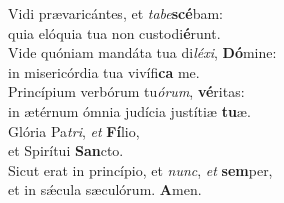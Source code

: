 \evenverse Vidi prævaricántes, et \textit{ta}\textit{be}\textbf{scé}bam:~\*\\
\evenverse quia elóquia tua non custodi\textbf{é}runt.\\
\oddverse Vide quóniam mandáta tua di\textit{lé}\textit{xi}, \textbf{Dó}mine:~\*\\
\oddverse in misericórdia tua vivífi\textbf{ca} me.\\
\evenverse Princípium verbórum tu\textit{ó}\textit{rum}, \textbf{vé}ritas:~\*\\
\evenverse in ætérnum ómnia judícia justítiæ \textbf{tu}æ.\\
\oddverse Glória Pa\textit{tri}, \textit{et} \textbf{Fí}lio,~\*\\
\oddverse et Spirítui \textbf{San}cto.\\
\evenverse Sicut erat in princípio, et \textit{nunc}, \textit{et} \textbf{sem}per,~\*\\
\evenverse et in sǽcula sæculórum. \textbf{A}men.\\
